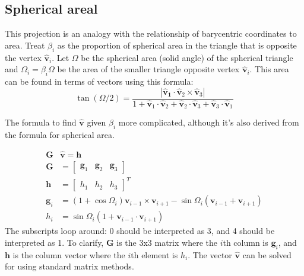 \documentclass{amsart}[12pt]
\begin{document}
\subsection{Spherical areal}
This projection is an analogy with the relationship of barycentric coordinates
to area. Treat $\beta_i$ as the proportion of spherical area in the triangle
that is opposite the vertex $\hat{\mathbf v}_i$. Let $\Omega$ be the spherical
area (solid angle) of the spherical triangle and $\Omega_i = \beta_i\Omega$ be
the area of the smaller triangle opposite vertex $\hat{\mathbf v}_i$.
This area can be found in terms of vectors using this formula:\cite{oosterom}\cite{eriksson}
\begin{equation}
\tan(\Omega/2) = \frac{|\mathbf{\hat{v}_1} \cdot
       \mathbf{\hat{v}}_2 \times \mathbf{\hat{v}}_3|}
       {1+\mathbf{\hat{v}}_1\cdot \mathbf{\hat{v}}_2+\mathbf{\hat{v}}_2
       \cdot \mathbf{\hat{v}}_3+\mathbf{\hat{v}}_3\cdot \mathbf{\hat{v}}_1}
\end{equation}

The formula to find $\hat{\mathbf v}$ given $\beta_i$ more complicated,
although it's also derived from the formula for spherical area.


\begin{equation}
\label{eq:sphareal}
  \begin{split}
  \mathbf G & \hat{\mathbf v} = \mathbf h \\
   \mathbf G & = \begin{bmatrix}
   \mathbf g_1 & \mathbf g_2 & \mathbf g_3 \end{bmatrix} \\
   \mathbf h & = \begin{bmatrix} h_1  & h_2 & h_3  \end{bmatrix}^T \\
   \mathbf g_{i} & = \left(1+\cos \Omega_{i}\right) \mathbf v_{i-1} \times
   \mathbf v_{i+1} - \sin\Omega_{i}\left(\mathbf v_{i-1} +
   \mathbf v_{i+1}\right)\\
   h_i &= \sin\Omega_i\left(1+\mathbf v_{i-1}\cdot\mathbf v_{i+1}\right)
\end{split}\end{equation}
The subscripts loop around: 0 should be interpreted as 3, and 4 should be
interpreted as 1. To clarify, $\mathbf G$ is the 3x3 matrix where the $i$th
column is $\mathbf g_i$, and $\mathbf h$ is the column vector where the
$i$th element is $h_i$. The vector $\hat{\mathbf v}$
can be solved for using standard matrix methods.
\end{document}
